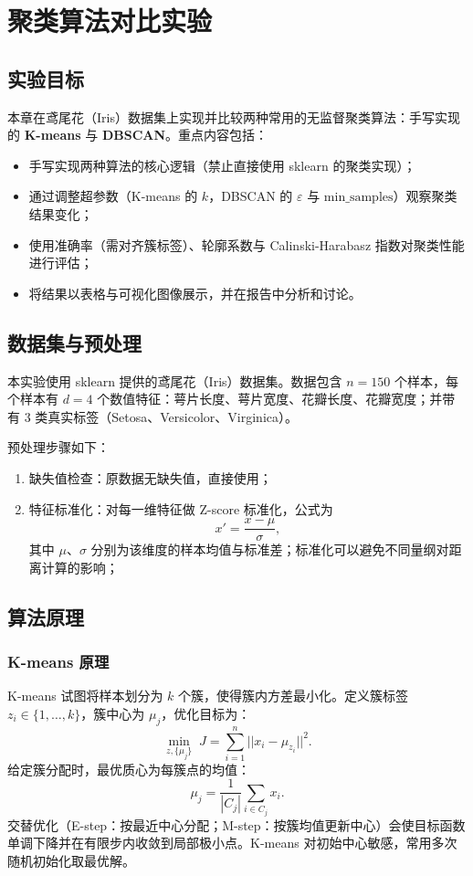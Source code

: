 \chapter{聚类算法对比实验}

\section{实验目标}
本章在鸢尾花（Iris）数据集上实现并比较两种常用的无监督聚类算法：手写实现的 \textbf{K-means} 与 \textbf{DBSCAN}。重点内容包括：
\begin{itemize}
    \item 手写实现两种算法的核心逻辑（禁止直接使用 sklearn 的聚类实现）；
    \item 通过调整超参数（K-means 的 $k$，DBSCAN 的 $\varepsilon$ 与 $\mathrm{min\_samples}$）观察聚类结果变化；
    \item 使用准确率（需对齐簇标签）、轮廓系数与 Calinski-Harabasz 指数对聚类性能进行评估；
    \item 将结果以表格与可视化图像展示，并在报告中分析和讨论。
\end{itemize}

\section{数据集与预处理}
本实验使用 sklearn 提供的鸢尾花（Iris）数据集。数据包含 $n=150$ 个样本，每个样本有 $d=4$ 个数值特征：萼片长度、萼片宽度、花瓣长度、花瓣宽度；并带有 3 类真实标签（Setosa、Versicolor、Virginica）。

预处理步骤如下：
\begin{enumerate}
    \item 缺失值检查：原数据无缺失值，直接使用；
    \item 特征标准化：对每一维特征做 Z-score 标准化，公式为
    $$x' = \frac{x-\mu}{\sigma},$$
    其中 $\mu$、$\sigma$ 分别为该维度的样本均值与标准差；标准化可以避免不同量纲对距离计算的影响；
\end{enumerate}

\section{算法原理}
\subsection{K-means 原理}
K-means 试图将样本划分为 $k$ 个簇，使得簇内方差最小化。定义簇标签 $z_i\in\{1,\dots,k\}$，簇中心为 $\mu_j$，优化目标为：
$$\min_{z,\{\mu_j\}} \; J = \sum_{i=1}^n ||x_i - \mu_{z_i}||^2.$$ 
给定簇分配时，最优质心为每簇点的均值：
$$\mu_j = \frac{1}{|C_j|}\sum_{i\in C_j} x_i.$$ 
交替优化（E-step：按最近中心分配；M-step：按簇均值更新中心）会使目标函数单调下降并在有限步内收敛到局部极小点。K-means 对初始中心敏感，常用多次随机初始化取最优解。


